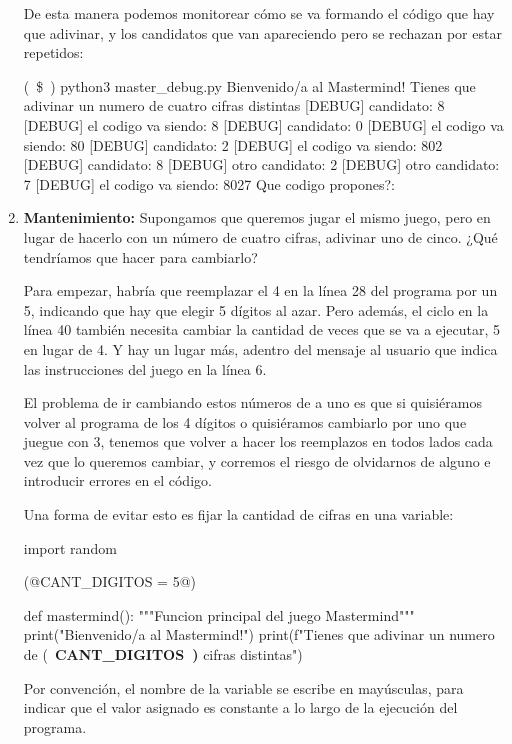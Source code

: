 \begin{enumerate}
De esta manera podemos monitorear cómo se va formando el código que hay que
adivinar, y los candidatos que van apareciendo pero se rechazan por estar
repetidos:

\begin{codigo-nohl-sn}
(~\$~) python3 master_debug.py
Bienvenido/a al Mastermind!
Tienes que adivinar un numero de cuatro cifras distintas
[DEBUG] candidato: 8
[DEBUG] el codigo va siendo: 8
[DEBUG] candidato: 0
[DEBUG] el codigo va siendo: 80
[DEBUG] candidato: 2
[DEBUG] el codigo va siendo: 802
[DEBUG] candidato: 8
[DEBUG] otro candidato: 2
[DEBUG] otro candidato: 7
[DEBUG] el codigo va siendo: 8027
Que codigo propones?:
\end{codigo-nohl-sn}

\item {\bf Mantenimiento:}
\label{str:mant}
Supongamos que queremos jugar el mismo juego, pero en lugar de hacerlo con un
número de cuatro cifras, adivinar uno de cinco. ¿Qué tendríamos que hacer para
cambiarlo?

Para empezar, habría que reemplazar el 4 en la línea 28 del programa por un
5, indicando que hay que elegir 5 dígitos al azar. Pero además, el ciclo en la
línea 40 también necesita cambiar la cantidad de veces que se va a ejecutar, 5
en lugar de 4. Y hay un lugar más, adentro del mensaje al usuario que indica las
instrucciones del juego en la línea 6.

El problema de ir cambiando estos números de a uno es que si quisiéramos volver
al programa de los 4 dígitos o quisiéramos cambiarlo por uno que juegue con 3,
tenemos que volver a hacer los reemplazos en todos lados cada vez que lo
queremos cambiar, y corremos el riesgo de olvidarnos de alguno e introducir
errores en el código.

Una forma de evitar esto es fijar la cantidad de cifras en una variable:

\begin{codigo-python-sn}
import random

(@CANT_DIGITOS = 5@)

def mastermind():
    """Funcion principal del juego Mastermind"""
    print("Bienvenido/a al Mastermind!")
    print(f"Tienes que adivinar un numero de {(~\bfseries{CANT\_DIGITOS}~)} cifras distintas")
\end{codigo-python-sn}

Por convención, el nombre de la variable se escribe en mayúsculas, para indicar
que el valor asignado es constante a lo largo de la ejecución del programa.


\end{enumerate}
